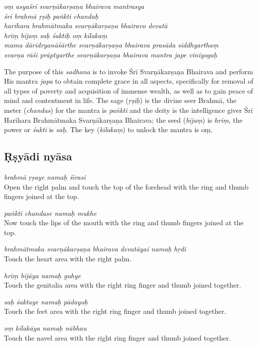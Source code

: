 \documentclass[11pt,oneside,a4paper]{article}
\newenvironment{shloka}[1]
  {\bigskip\center#1\varwidth{\linewidth}}
  {\endvarwidth\endcenter\bigskip}
\newcommand{\tl}[1]{\emph{#1}}
\begin{document}
\begin{shloka}\itshape
  oṃ asyaśrī svarṇākarṣaṇa bhairava mantrasya \\
  śrī brahmā ṛṣiḥ paṅkti chandaḥ \\
  harihara brahmātmaka svarṇākarṣaṇa bhairavo devatā \\
  hrīṃ bījaṃ saḥ śaktiḥ oṃ kīlakaṃ \\
  mama dāridryanāśārthe svarṇākarṣaṇa bhairava prasāda siddhyarthaṃ \\
  svarṇa rāśi prāptyarthe svarṇākarṣaṇa bhairava mantra jape viniyogaḥ
\end{shloka}

The purpose of this \tl{sadhana} is to invoke Śrī Svarṇākarṣaṇa Bhairava and
perform His mantra \tl{japa} to obtain complete grace in all aspects,
specifically for removal of all types of poverty and acquisition of immense
wealth, as well as to gain peace of mind and contentment in life. The sage
(\tl{ṛṣiḥ}) is the divine seer Brahmā, the meter (\tl{chandas}) for the mantra
is \tl{paṅkti} and the deity is the intelligence giver Śrī Harihara Brahmātmaka
Svarṇākarṣaṇa Bhairava; the seed (\tl{bījaṃ}) is \tl{hrīṃ}, the power or
\tl{śakti} is \tl{saḥ}. The key (\tl{kīlakaṃ}) to unlock the mantra is oṃ.

\subsection{Ṛṣyādi nyāsa}

\tl{brahmā ṛṣaye namaḥ śirasi}\\
Open the right palm and touch the top of the forehead with the ring and thumb
fingers joined at the top.

\tl{paṅkti chandase namaḥ mukhe}\\
Now touch the lips of the mouth with the ring and thumb fingers joined at
the top.

\tl{brahmātmaka svarṇākarṣaṇa bhairava devatāyai namaḥ hṛdi}\\
Touch the heart area with the right palm.

\tl{hrīṃ bījāya namaḥ guhye}\\
Touch the genitalia area with the right ring finger and thumb joined together.

\tl{saḥ śaktaye namaḥ pādayoḥ}\\
Touch the feet area with the right ring finger and thumb joined together.

\tl{oṃ kīlakāya namaḥ nābhau}\\
Touch the navel area with the right ring finger and thumb joined together.
\end{document}
